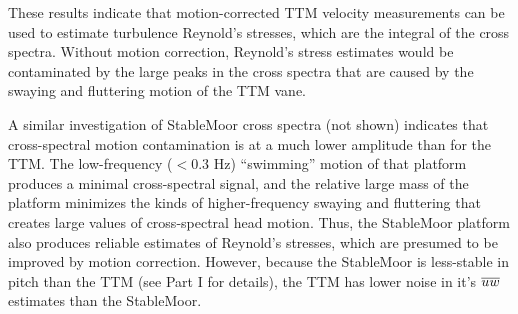 

These results indicate that motion-corrected TTM velocity measurements can be used to estimate turbulence Reynold's stresses, which are the integral of the cross spectra. Without motion correction, Reynold's stress estimates would be contaminated by the large peaks in the cross spectra that are caused by the swaying and fluttering motion of the TTM vane.

A similar investigation of StableMoor cross spectra (not shown) indicates that cross-spectral motion contamination is at a much lower amplitude than for the TTM. The low-frequency ($<0.3$ Hz) ``swimming'' motion of that platform produces a minimal cross-spectral signal, and the relative large mass of the platform minimizes the kinds of higher-frequency swaying and fluttering that creates large values of cross-spectral head motion. Thus, the StableMoor platform also produces reliable estimates of Reynold's stresses, which are presumed to be improved by motion correction. However, because the StableMoor is less-stable in pitch than the TTM (see Part I for details), the TTM has lower noise in it's $\overline{uw}$ estimates than the StableMoor.





